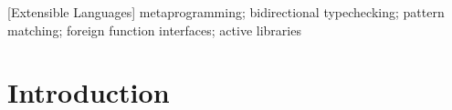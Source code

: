 \documentclass[10pt]{sigplanconf}
\newcommand{\typy}{\texttt{\footnotesize typy}}
\begin{document}
\begin{abstract}
\end{abstract}

[Extensible Languages]
\keywords
metaprogramming; bidirectional typechecking; pattern matching; foreign function interfaces; active libraries
\section{Introduction}\label{intro}
\end{document}
